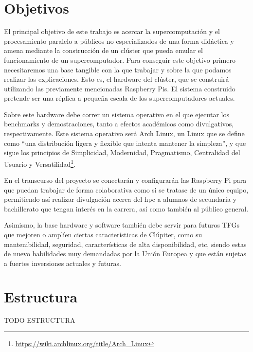 \section{Objetivos}
\label{sec:objetivos}

El principal objetivo de este trabajo es acercar la supercomputación y el procesamiento paralelo a públicos no especializados de una forma didáctica y amena mediante la construcción de un clúster que pueda emular el funcionamiento de un supercomputador. Para conseguir este objetivo primero necesitaremos una base tangible con la que trabajar y sobre la que podamos realizar las explicaciones. Esto es, el hardware del clúster, que se construirá utilizando las previamente mencionadas Raspberry Pis. El sistema construido pretende ser una réplica a pequeña escala de los supercomputadores actuales.

Sobre este hardware debe correr un sistema operativo en el que ejecutar los benchmarks y demostraciones, tanto a efectos académicos como divulgativos, respectivamente. Este sistema operativo será Arch Linux, un Linux que se define como ``una distribución ligera y flexible que intenta mantener la simpleza'', y que sigue los principios de Simplicidad, Modernidad, Pragmatismo, Centralidad del Usuario y Versatilidad\footnote{\url{https://wiki.archlinux.org/title/Arch\_Linux}}.

En el transcurso del proyecto se conectarán y configurarán las Raspberry Pi para que puedan trabajar de forma colaborativa como si se tratase de un único equipo, permitiendo así realizar divulgación acerca del \acrshort{hpc} a alumnos de secundaria y bachillerato que tengan interés en la carrera, así como también al público general.

Asimismo, la base hardware y software también debe servir para futuros TFGs que mejoren o amplíen ciertas características de Clúpiter, como su mantenibilidad, seguridad, características de alta disponibilidad, etc, siendo estas de nuevo habilidades muy demandadas por la Unión Europea y que están sujetas a fuertes inversiones actuales y futuras.



\section{Estructura}
\label{sec:estructura}

TODO ESTRUCTURA
